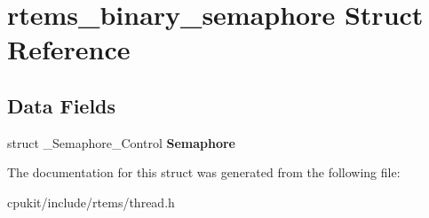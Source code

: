 \hypertarget{structrtems__binary__semaphore}{}\section{rtems\+\_\+binary\+\_\+semaphore Struct Reference}
\label{structrtems__binary__semaphore}
\subsection*{Data Fields}
\begin{DoxyCompactItemize}
\item 
\mbox{\label{structrtems__binary__semaphore_a0823c4e7494946f4e31c10b1825618a7}} 
struct \+\_\+\+Semaphore\+\_\+\+Control {\bfseries Semaphore}
\end{DoxyCompactItemize}


The documentation for this struct was generated from the following file\+:\begin{DoxyCompactItemize}
\item 
cpukit/include/rtems/thread.\+h\end{DoxyCompactItemize}
